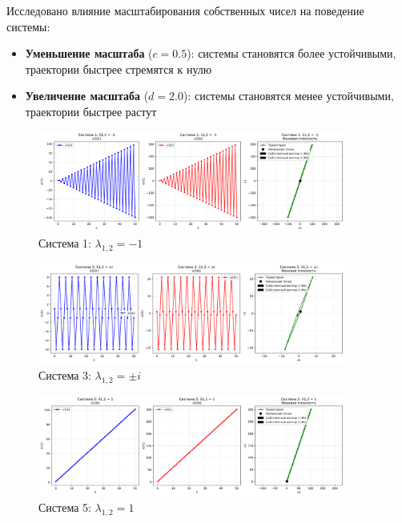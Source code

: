 Исследовано влияние масштабирования собственных чисел на поведение системы:

\begin{itemize}
    \item \textbf{Уменьшение масштаба} ($c = 0.5$): системы становятся более устойчивыми, траектории быстрее стремятся к нулю
    \item \textbf{Увеличение масштаба} ($d = 2.0$): системы становятся менее устойчивыми, траектории быстрее растут
\end{itemize}

\begin{figure}[H]
    \centering
    \includegraphics[width=0.9\textwidth]{images/task2/system1_lambda_minus1.png}
    \caption{Система 1: $\lambda_{1,2} = -1$}
\end{figure}

\begin{figure}[H]
    \centering
    \includegraphics[width=0.9\textwidth]{images/task2/system3_lambda_pure_imaginary.png}
    \caption{Система 3: $\lambda_{1,2} = \pm i$}
\end{figure}

\begin{figure}[H]
    \centering
    \includegraphics[width=0.9\textwidth]{images/task2/system5_lambda_plus1.png}
    \caption{Система 5: $\lambda_{1,2} = 1$}
\end{figure}

